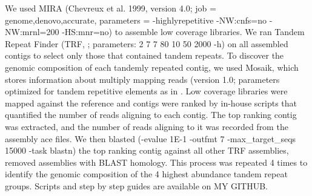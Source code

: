 \documentclass[10pt,letterpaper]{article}
\begin{document}
We used MIRA (Chevreux et al. 1999, version 4.0; job = genome,denovo,accurate, parameters = -highlyrepetitive -NW:cnfs=no -NW:mrnl=200 -HS:mnr=no) to assemble low coverage libraries.
We ran Tandem Repeat Finder \cite{benson1999tandem}  (TRF, ; parameters: 2 7 7 80 10 50 2000 -h) on all assembled contigs to select only those that contained tandem repeats.  
To discover the genomic composition of each tandemly repeated contig, we used Mosaik, which stores information about multiply mapping reads (version 1.0; parameters optimized for tandem repetitive elements as in \cite{bilinski2014diversity}.
Low coverage libraries were mapped against the reference and contigs were ranked by in-house scripts that quantified the number of reads aligning to each contig.
The top ranking contig was extracted, and the number of reads aligning to it was recorded from the assembly ace files.
We then blasted (-evalue 1E-1 -outfmt 7 -max\_target\_seqs 15000 -task blastn) the top ranking contig against all other TRF assemblies, removed assemblies with BLAST homology.
This process was repeated 4 times to identify the genomic composition of the 4 highest abundance tandem repeat groups.
Scripts and step by step guides are available on MY GITHUB.
\end{document}
